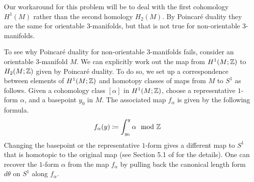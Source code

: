 Our workaround for this problem will be to deal with the first cohomology $H^1(M)$ rather than the second homology $H_2(M)$.
By Poincar\'e duality they are the same for orientable 3-manifolds, but that is not true for non-orientable $3$-manifolds.

To see why Poincar\'e duality for non-orientable 3-manifolds fails, consider an orientable $3$-manifold $M$.
We can explicitly work out the map from $H^1(M; \mathbb{Z})$ to $H_2(M; \mathbb{Z})$ given by Poincar\'e duality.
To do so, we set up a correspondence between elements of $H^1(M; \mathbb{Z})$ and homotopy classes of maps from $M$ to $S^1$ as follows.
Given a cohomology class $[\alpha]$ in $H^1(M; \mathbb{Z})$, choose a representative $1$-form $\alpha$, and a basepoint $y_0$ in $M$.
The associated map $f_{\alpha}$ is given by the following formula.
\begin{align}\label{form:map}
  f_{\alpha}(y) \coloneqq  \int_{y_0}^y \alpha \mod {\mathbb{Z}}
\end{align}
Changing the basepoint or the representative $1$-form gives a different map to $S^1$ that is homotopic to the original map (see Section 5.1 of \cite{calegari2007foliations} for the details).
One can recover the $1$-form $\alpha$ from the map $f_{\alpha}$ by pulling back the canonical length form $d\theta$ on $S^1$ along $f_{\alpha}$.

